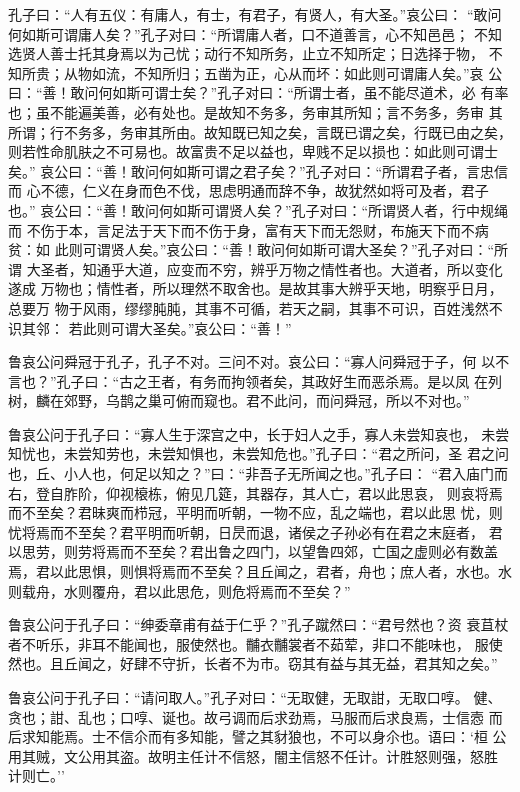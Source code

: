 \documentclass[]{article}
\begin{document}
孔子曰：``人有五仪：有庸人，有士，有君子，有贤人，有大圣。''哀公曰：
``敢问何如斯可谓庸人矣？''孔子对曰：``所谓庸人者，口不道善言，心不知邑邑；
不知选贤人善士托其身焉以为己忧；动行不知所务，止立不知所定；日选择于物，
不知所贵；从物如流，不知所归；五凿为正，心从而坏：如此则可谓庸人矣。''哀
公曰：``善！敢问何如斯可谓士矣？''孔子对曰：``所谓士者，虽不能尽道术，必
有率也；虽不能遍美善，必有处也。是故知不务多，务审其所知；言不务多，务审
其所谓；行不务多，务审其所由。故知既已知之矣，言既已谓之矣，行既已由之矣，
则若性命肌肤之不可易也。故富贵不足以益也，卑贱不足以损也：如此则可谓士矣。''
哀公曰：``善！敢问何如斯可谓之君子矣？''孔子对曰：``所谓君子者，言忠信而
心不德，仁义在身而色不伐，思虑明通而辞不争，故犹然如将可及者，君子也。''
哀公曰：``善！敢问何如斯可谓贤人矣？''孔子对曰：``所谓贤人者，行中规绳而
不伤于本，言足法于天下而不伤于身，富有天下而无怨财，布施天下而不病贫：如
此则可谓贤人矣。''哀公曰：``善！敢问何如斯可谓大圣矣？''孔子对曰：``所谓
大圣者，知通乎大道，应变而不穷，辨乎万物之情性者也。大道者，所以变化遂成
万物也；情性者，所以理然不取舍也。是故其事大辨乎天地，明察乎日月，总要万
物于风雨，缪缪肫肫，其事不可循，若天之嗣，其事不可识，百姓浅然不识其邻：
若此则可谓大圣矣。''哀公曰：``善！''

鲁哀公问舜冠于孔子，孔子不对。三问不对。哀公曰：``寡人问舜冠于子，何
以不言也？''孔子曰：``古之王者，有务而拘领者矣，其政好生而恶杀焉。是以凤
在列树，麟在郊野，乌鹊之巢可俯而窥也。君不此问，而问舜冠，所以不对也。''

鲁哀公问于孔子曰：``寡人生于深宫之中，长于妇人之手，寡人未尝知哀也，
未尝知忧也，未尝知劳也，未尝知惧也，未尝知危也。''孔子曰：``君之所问，圣
君之问也，丘、小人也，何足以知之？''曰：``非吾子无所闻之也。''孔子曰：
``君入庙门而右，登自胙阶，仰视榱栋，俯见几筵，其器存，其人亡，君以此思哀，
则哀将焉而不至矣？君昧爽而栉冠，平明而听朝，一物不应，乱之端也，君以此思
忧，则忧将焉而不至矣？君平明而听朝，日昃而退，诸侯之子孙必有在君之末庭者，
君以思劳，则劳将焉而不至矣？君出鲁之四门，以望鲁四郊，亡国之虚则必有数盖
焉，君以此思惧，则惧将焉而不至矣？且丘闻之，君者，舟也；庶人者，水也。水
则载舟，水则覆舟，君以此思危，则危将焉而不至矣？''

鲁哀公问于孔子曰：``绅委章甫有益于仁乎？''孔子蹴然曰：``君号然也？资
衰苴杖者不听乐，非耳不能闻也，服使然也。黼衣黼裳者不茹荤，非口不能味也，
服使然也。且丘闻之，好肆不守折，长者不为市。窃其有益与其无益，君其知之矣。''

鲁哀公问于孔子曰：``请问取人。''孔子对曰：``无取健，无取詌，无取口啍。
健、贪也；詌、乱也；口啍、诞也。故弓调而后求劲焉，马服而后求良焉，士信悫
而后求知能焉。士不信尒而有多知能，譬之其豺狼也，不可以身尒也。语曰：`桓
公用其贼，文公用其盗。故明主任计不信怒，闇主信怒不任计。计胜怒则强，怒胜
计则亡。''
\end{document}
